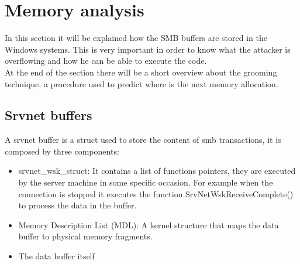 \section{Memory analysis}
In this section it will be explained how the SMB buffers are stored in the Windows systems. This is very important in order to know 
what the attacker is overflowing and how he can be able to execute the code.\\
At the end of the section there will be a short overview about the grooming technique, a procedure used to predict where is the next memory allocation.
\subsection{Srvnet buffers}
A srvnet buffer is a struct used to store the content of smb transactions, it is composed by three components\cite{eternalblue-checkpoint}:
\begin{itemize}
    \item srvnet\_wsk\_struct: It contains a list of functions pointers, they are executed by the server machine in some specific occasion. For example
    when the connection is stopped it executes the function SrvNetWskReceiveComplete() to process the data in the buffer.
    \item Memory Description List (MDL): A kernel structure that maps the data buffer to physical memory fragments.
    \item The data buffer itself
\end{itemize}

